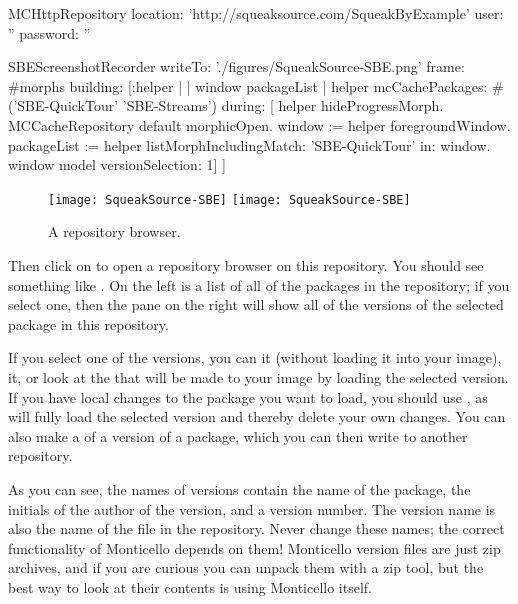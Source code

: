 \documentclass[a4paper,10pt,twoside]{book}
\begin{document}
\begin{code}{}
MCHttpRepository
	location: 'http://squeaksource.com/SqueakByExample'
	user: ''
	password: ''
\end{code}

\begin{ExecuteSmalltalkScript}
SBEScreenshotRecorder writeTo: './figures/SqueakSource-SBE.png' frame: #morphs building: [:helper |
	| window packageList |
	helper mcCachePackages: #('SBE-QuickTour' 'SBE-Streams') during: [
		helper hideProgressMorph.
		MCCacheRepository default morphicOpen.
		window := helper foregroundWindow.
		packageList := helper listMorphIncludingMatch: 'SBE-QuickTour' in: window.
		window model versionSelection: 1]
]
\end{ExecuteSmalltalkScript}
\begin{figure}[btp]
	\begin{center}
	\ifluluelse
		{\texttt{[image: SqueakSource-SBE]}}
		{\texttt{[image: SqueakSource-SBE]}}
	\end{center}
	\caption{A repository browser.}
	\label{fig:SqueakSource:SBE}
\end{figure}
\noindent
Then click on  to open a repository browser on this repository.
You should see something like .
On the left is a list of all of the packages in the repository; if you select one, then the pane on the right will show all of the versions of the selected package in this repository.

If you select one of the versions, you can  it (without loading it into your image),  it, or look at the  that will be made to your image by loading the selected version.
If you have local changes to the package you want to load, you should use , as  will fully load the selected version and thereby delete your own changes.
You can also make a  of a version of a package, which you can then write to another repository.

As you can see, the names of versions contain the name of the package, the initials of the author of the version, and a version number.
The version name is also the name of the file in the repository.
Never change these names; the correct functionality of Monticello depends on them!
Monticello version files are just zip archives, and if you are curious you can unpack them with a zip tool, but the best way to look at their contents is using Monticello itself.
\end{document}
